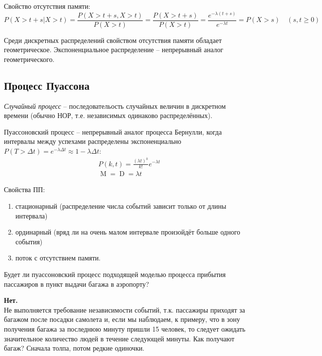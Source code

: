 \documentclass[a4paper,12pt,fleqn]{article}
\newenvironment{onsamepage} {\begin{minipage}{\textwidth}} {\end{minipage}}
\numberwithin{figure}{section}
\theoremstyle{definition}
\let\geqs\geqslant
\DeclareMathOperator{\M}{M}
\DeclareMathOperator{\D}{D}
\begin{document}
Свойство отсутствия памяти:
\[ P(X>t+s|X>t) = \frac{P(X>t+s,X>t)}{P(X>t)} = \frac{P(X>t+s)}{P(X>t)} =
   \frac{e^{-\lambda(t+s)}}{e^{-\lambda t}}=P(X>s) \quad (s,t\!\geqs\!0) \]

Среди дискретных распределений свойством отсутствия памяти обладает геометрическое.
Экспоненциальное распределение -- непрерывный аналог геометрического.


\subsection{Процесс Пуассона}

\textit{Случайный процесс} -- последовательость случайных величин в дискретном времени
(обычно НОР, т.е. независимых одинаково распределённых).

Пуассоновский процесс -- непрерывный аналог процесса Бернулли, когда интервалы между успехами распределены экспоненциально $P(T>\Delta t) = e^{-\lambda \Delta t} \approx 1-\lambda \Delta t$:
\begin{align*}
&	P(k,t) = \frac{(\lambda t)^k}{k!} e^{-\lambda t}	\\
&	\M = \D = \lambda t
\end{align*}

Свойства ПП:
\begin{enumerate}
	\item стационарный (распределение числа событий зависит только от длины интервала)
	\item ординарный (вряд ли на очень малом интервале произойдёт больше одного события)
	\item поток с отсутствием памяти.
\end{enumerate}


\begin{onsamepage}
\begin{problem}
	Будет ли пуассоновский процесс подходящей моделью процесса
	прибытия пассажиров в пункт выдачи багажа в аэропорту?
\end{problem}
\begin{solution}
  \textbf{Нет.}\\
	Не выполняется требование независимости событий, т.к.
	пассажиры приходят за багажом после посадки самолета и, если мы наблюдаем,
	к примеру, что в зону получения багажа за последнюю минуту пришли 15 человек,
	то следует ожидать значительное количество людей в течение следующей минуты.
	Как получают багаж? Сначала толпа, потом редкие одиночки.
\end{solution}
\end{onsamepage}
\end{document}
